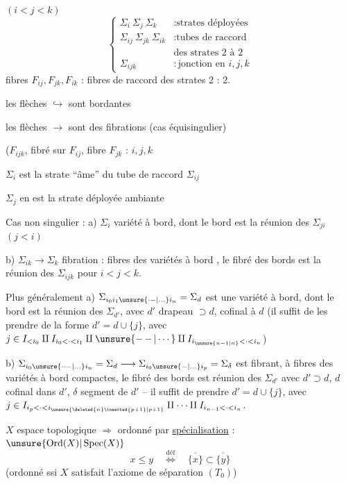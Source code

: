 $(i<j<k)$
\[
\left\{\begin{array}{ll}
\Sigma_i\ \Sigma_j\ \Sigma_k &: \text{strates déployées}\\
\Sigma_{ij}\ \Sigma_{jk}\ \Sigma_{ik} &: \text{tubes de raccord}\\
&\text{des strates 2 à 2}\\
\Sigma_{ijk} &: \text{jonction en }i,j,k
\end{array}\right.
\]
fibres $F_{ij},F_{jk},F_{ik}$ : fibres de raccord
 des strates 2 : 2.

les flèches $\hookrightarrow$ sont bordantes

les flèches $\longrightarrow$ sont des fibrations 
(cas équisingulier)

($F_{ijk}$, fibré sur $F_{ij}$, fibre $F_{jk}$ : 
 $i,j,k$

$\Sigma_i$ est la strate  ``âme'' du tube de raccord $\Sigma_{ij}$

$\Sigma_j$ en est la strate déployée ambiante

Cas non singulier : a) $\Sigma_i$ variété à bord, dont le bord est
la réunion des $\Sigma_{ji}$ $(j<i)$

b) $\Sigma_{ik}\longrightarrow\Sigma_k$ fibration : fibres des
variétés à bord , le fibré des bords est
la réunion des $\Sigma_{ijk}$ pour $i<j<k$.

Plus généralement \unsure{;|:} a) $\Sigma_{i_0i_1\unsure{\mathinner{\cdot-}|\ldots}i_n}=\Sigma_d$ est une
variété à bord, dont le bord est la réunion des
$\Sigma_{d'}$, avec $d'$ drapeau $\supset d$, cofinal à $d$
(il suffit de les prendre de la forme $d'=d\cup\{j\}$,
avec $j\in I_{<i_0}\amalg I_{i_0<\cdot<i_1}\amalg\unsure{\mathinner{-\,-}|\cdots}\amalg I_{i_{\unsure{n-1|n}}<\cdot<i_n}$)

b) $\Sigma_{i_0\unsure{\mathinner{\cdot\cdot-}|\ldots}i_n}=\Sigma_d\longrightarrow\Sigma_{i_0\unsure{-|\ldots}i_p}=\Sigma_\delta$
est fibrant, à fibres des variétés à bord compactes,
le fibré des bords est réunion des $\Sigma_{d'}$
avec $d'\supset d$, $d$ cofinal dans $d'$, $\delta$ segment 
de $d'$ -- il suffit de prendre $d'=d\cup\{j\}$, avec
$j\in I_{i_p<\cdot<i_{\unsure{\deleted{n}\inserted{p+1}|p+1}}}\amalg\cdots\amalg I_{i_{n-1}<\cdot<i_n}$.



$X$ espace topologique $\Longrightarrow$ ordonné par \uline{spécialisation} : $\unsure{\operatorname{Ord}(X)|\operatorname{Spec}(X)}$
\[
x\leq y\quad\overset{\mathrm{déf}}{\Longleftrightarrow}\quad\overline{\{x\}}\subset\overline{\{y\}}
\]
(ordonné ssi $X$ satisfait l'axiome de séparation $(T_0)$)


